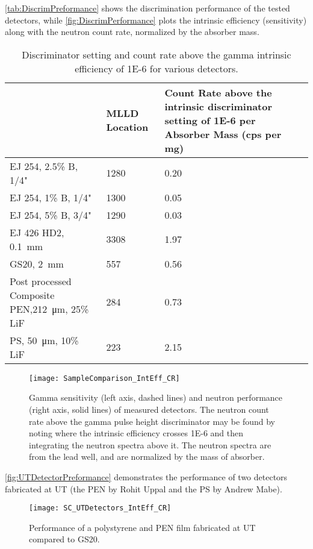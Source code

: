 \autoref{tab:DiscrimPreformance} shows the discrimination performance of the tested detectors, while \autoref{fig:DiscrimPerformance} plots the intrinsic efficiency (sensitivity) along with the neutron count rate, normalized by the absorber mass.
\begin{table}
  \centering
  \caption[Discrimination Performance]{Discriminator setting and count rate above the gamma intrinsic efficiency of \num{1E-6} for various detectors.}
  \label{tab:DiscrimPreformance}
  \begin{tabular}{m{5cm} | m{2cm} m{6cm}}
    \toprule
    &	MLLD Location	&	Count Rate above the intrinsic discriminator setting of \num{1E-6} per Absorber Mass (cps per mg)	\\
    \midrule
    EJ 254, 2.5\% B, 1/4"	&	1280	&	0.20	\\
    EJ 254, 1\% B, 1/4"	&	1300	&	0.05	\\
    EJ 254, 5\% B, 3/4"	&	1290		&	0.03	\\
    EJ 426 HD2, \SI{0.1}{\mm}&	3308		&	1.97	\\
    GS20, \SI{2}{\mm}	&	557		&	0.56	\\
    Post processed Composite PEN,\SI{212}{\um}, 25\% LiF	&	284	&	0.73	\\
    PS, \SI{50}{\um}, 10\% LiF & 223 & 2.15\\
    \bottomrule
\end{tabular}
\end{table}
\begin{figure}
  \centering
  \texttt{[image: SampleComparison\_IntEff\_CR]}
  \caption[Gamma Sensitivity and Neutron Response of Measured Detectors]{Gamma sensitivity (left axis, dashed lines) and neutron performance (right axis, solid lines) of measured detectors.  The neutron count rate above the gamma pulse height discriminator may be found by noting where the intrinsic efficiency crosses \num{1E-6} and then integrating the neutron spectra above it. The neutron spectra are from the lead well, and are normalized by the mass of absorber.}
  \label{fig:DiscrimPerformance}
\end{figure}
\autoref{fig:UTDetectorPreformance} demonstrates the performance of two detectors fabricated at UT (the PEN by Rohit Uppal and the PS by Andrew Mabe).
\begin{figure}
  \centering
  \texttt{[image: SC\_UTDetectors\_IntEff\_CR]}
  \caption[UT Fabricated Detector Performance]{Performance of a polystyrene and PEN film fabricated at UT compared to GS20.}
  \label{fig:UTDetectorPreformance}
\end{figure}

